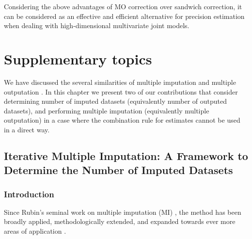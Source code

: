 \documentclass[11pt,a5paper,twoside]{book}
\begin{document}
Considering the above advantages of MO correction over sandwich correction, it can be considered as an effective and efficient alternative for precision estimation when dealing with high-dimensional multivariate joint models.













\chapter{Supplementary topics}
\label{chap_supp}
We have discussed the several similarities of multiple imputation \citep{rubin1987, carpenter2012} and multiple outputation \citep{hoffman2001, follmann2003}. In this chapter we present two of our contributions that consider determining number of imputed datasets (equivalently number of outputed datasets), and performing multiple imputation (equivalently multiple outputation) in a case where the combination rule for estimates cannot be used in a direct way.

\section[Iterative Multiple Imputation]{Iterative Multiple Imputation: A Framework to Determine the Number of Imputed Datasets}
\label{secc_IMI}



\subsection{Introduction}

Since Rubin's seminal work on multiple imputation (MI) \citep{rubin1978,rubin1979,rubin1987},
the method has been broadly applied, methodologically extended, and expanded towards ever more areas of application  \citep{carpenter2008,buuren12,carpenter2012,wim2015}.  {\color{black}{Multiple imputation is a commonly used approach to analyze incomplete data. A growing literature and increasing number of software implementations have contributed to the spread of the method. One of the attractions of MI is its very good to excellent performance even with a relatively small number of imputed datasets. This was important when Rubin created the method, about forty years ago, in view of, among others, the US Census. It still is today because of ever increasing data streams.}} 
\end{document}
